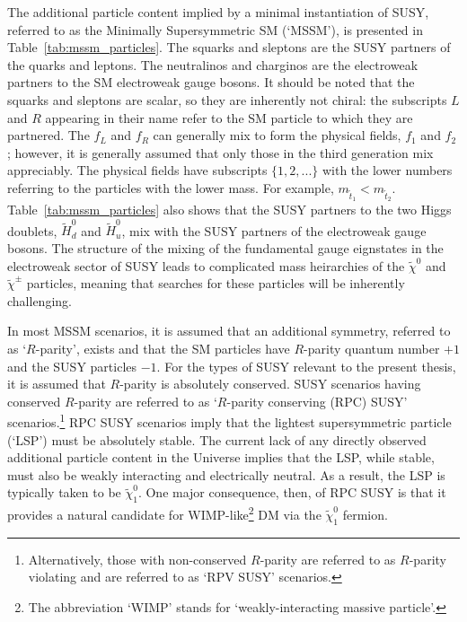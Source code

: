 The additional particle content implied by a minimal instantiation of SUSY, referred
to as the Minimally Supersymmetric SM (`MSSM'), is presented in Table~\ref{tab:mssm_particles}.
The squarks and sleptons are the SUSY partners of the quarks and leptons.
The neutralinos and charginos are the electroweak partners to the SM electroweak gauge bosons.
It should be noted that the squarks and sleptons are scalar, so they are inherently not chiral:
the subscripts $L$ and $R$ appearing in their name refer to the SM particle to which they are partnered.
The $f_L$ and $f_R$ can generally mix to form the physical fields, $f_1$ and $f_2$; however, it is generally assumed
that only those in the third generation mix appreciably.
The physical fields have subscripts $\{1,2,...\}$ with the lower numbers referring to the particles
with the lower mass.
For example, $m_{\tilde{t}_1} < m_{\tilde{t}_2}$.
Table~\ref{tab:mssm_particles} also shows that the SUSY partners to the two Higgs doublets, $\tilde{H}^0_d$ and $\tilde{H}^{0}_u$, mix with the
SUSY partners of the electroweak gauge bosons.
The structure of the mixing of the fundamental gauge eignstates in the electroweak sector of SUSY
leads to complicated mass heirarchies of the $\tilde{\chi}^0$ and $\tilde{\chi}^{\pm}$ particles, meaning that searches
for these particles will be inherently challenging.

In most MSSM scenarios, it is assumed that an additional symmetry, referred to as `$R$-parity', exists
and that the SM particles have $R$-parity quantum number $+1$ and the SUSY particles $-1$.
For the types of SUSY relevant to the present thesis, it is assumed that $R$-parity is absolutely conserved.
SUSY scenarios having conserved $R$-parity are referred to as `$R$-parity conserving (RPC) SUSY' scenarios.\footnote{
Alternatively, those with non-conserved $R$-parity are referred to as $R$-parity violating and are referred
to as `RPV SUSY' scenarios.
}
RPC SUSY scenarios imply that the lightest supersymmetric particle (`LSP') must be absolutely stable.
The current lack of any directly observed additional particle content in the Universe implies that the LSP, while stable,
must also be weakly interacting and electrically neutral.
As a result, the LSP is typically taken to be $\tilde{\chi}^0_1$.
One major consequence, then, of RPC SUSY is that it provides a natural candidate for WIMP-like\footnote{
The abbreviation `WIMP' stands for `weakly-interacting massive particle'.
} DM via the $\tilde{\chi}^0_1$ fermion.

